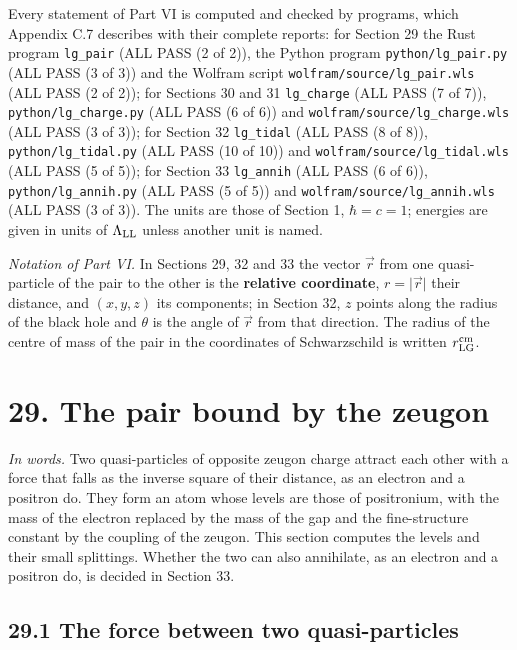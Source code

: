 \documentclass[
  10pt,
]{article}
\begin{document}
Every statement of Part VI is computed and checked by programs, which
Appendix C.7 describes with their complete reports: for Section 29 the
Rust program \texttt{lg\_pair} (ALL PASS (2 of 2)), the Python program
\texttt{python/lg\_pair.py} (ALL PASS (3 of 3)) and the Wolfram script
\texttt{wolfram/source/lg\_pair.wls} (ALL PASS (2 of 2)); for Sections
30 and 31 \texttt{lg\_charge} (ALL PASS (7 of 7)),
\texttt{python/lg\_charge.py} (ALL PASS (6 of 6)) and
\texttt{wolfram/source/lg\_charge.wls} (ALL PASS (3 of 3)); for Section
32 \texttt{lg\_tidal} (ALL PASS (8 of 8)), \texttt{python/lg\_tidal.py}
(ALL PASS (10 of 10)) and \texttt{wolfram/source/lg\_tidal.wls} (ALL
PASS (5 of 5)); for Section 33 \texttt{lg\_annih} (ALL PASS (6 of 6)),
\texttt{python/lg\_annih.py} (ALL PASS (5 of 5)) and
\texttt{wolfram/source/lg\_annih.wls} (ALL PASS (3 of 3)). The units are
those of Section 1, \(\hbar=c=1\); energies are given in units of
\(\Lambda_{\rm LL}\) unless another unit is named.

\emph{Notation of Part VI.} In Sections 29, 32 and 33 the vector
\(\vec r\) from one quasi-particle of the pair to the other is the
\textbf{relative coordinate}, \(r=\lvert\vec r\rvert\) their distance,
and \((x,y,z)\) its components; in Section 32, \(z\) points along the
radius of the black hole and \(\theta\) is the angle of \(\vec r\) from
that direction. The radius of the centre of mass of the pair in the
coordinates of Schwarzschild is written \(r^{\rm cm}_{\rm LG}\).

\hypertarget{the-pair-bound-by-the-zeugon}{%
\section{29. The pair bound by the
zeugon}\label{the-pair-bound-by-the-zeugon}}

\emph{In words.} Two quasi-particles of opposite zeugon charge attract
each other with a force that falls as the inverse square of their
distance, as an electron and a positron do. They form an atom whose
levels are those of positronium, with the mass of the electron replaced
by the mass of the gap and the fine-structure constant by the coupling
of the zeugon. This section computes the levels and their small
splittings. Whether the two can also annihilate, as an electron and a
positron do, is decided in Section 33.

\hypertarget{the-force-between-two-quasi-particles}{%
\subsection{29.1 The force between two
quasi-particles}\label{the-force-between-two-quasi-particles}}
\end{document}
